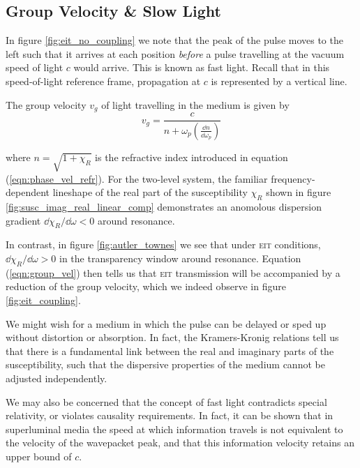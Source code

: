   \subsection{Group Velocity \& Slow Light}

    In figure \ref{fig:eit_no_coupling} we note that the peak of the pulse moves
    to the left such that it arrives at each position \textit{before} a pulse
    travelling at the vacuum speed of light $c$ would arrive. This is known as
    fast light. Recall that in this speed-of-light reference frame, propagation
    at $c$ is represented by a vertical line.

    The group velocity $v_g$ of light travelling in the medium is given by\cite{Fleischhauer2005}
    \begin{equation}
        v_g = \frac{c}{n + \omega_p (\frac{\dd n}{\dd \omega_p})}
        \label{eqn:group_vel}
    \end{equation}

    where $n = \sqrt{1 + \chi_R}$ is the refractive index
    introduced in equation (\ref{eqn:phase_vel_refr}). For the two-level system,
    the familiar frequency-dependent lineshape of the real part of the
    susceptibility $\chi_R$ shown in figure
    \ref{fig:susc_imag_real_linear_comp} demonstrates an anomolous dispersion
    gradient $\dd \chi_R / \dd \omega < 0$ around resonance.

    In contrast, in figure \ref{fig:autler_townes} we see that under \textsc{eit}
    conditions, $\dd \chi_R / \dd \omega > 0$ in the transparency window around
    resonance.\cite{Xiao1995} Equation (\ref{eqn:group_vel}) then tells us that
    \textsc{eit} transmission will be accompanied by a reduction of the group
    velocity, which we indeed observe in figure \ref{fig:eit_coupling}.

    We might wish for a medium in which the pulse can be delayed or sped up
    without distortion or absorption. In fact, the Kramers-Kronig
    relations\cite{deL.Kronig:26} tell us that there is a fundamental link
    between the real and imaginary parts of the susceptibility, such that the
    dispersive properties of the medium cannot be adjusted independently.

    We may also be concerned that the concept of fast light contradicts special
    relativity\cite{Einstein1905}, or violates causality requirements. In fact,
    it can be shown that in superluminal media the speed at which information
    travels is not equivalent to the velocity of the wavepacket peak, and that
    this information velocity retains an upper bound of $c$.\cite{Kuzmich2001,
    Stenner2003}

